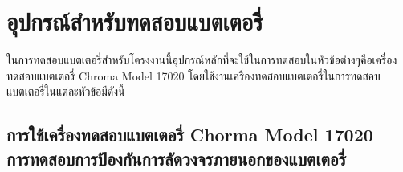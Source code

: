 \section{อุปกรณ์สำหรับทดสอบแบตเตอรี่}
ในการทดสอบแบตเตอรี่สำหรับโครงงานนี้อุปกรณ์หลักที่จะใช้ในการทดสอบในหัวข้อต่างๆคือเครื่องทดสอบแบตเตอรี่ Chroma Model 17020 โดยใช้งานเครื่องทดสอบแบตเตอรี่ในการทดสอบแบตเตอรี่ในแต่ละหัวข้อมีดังนี้
\subsection{การใช้เครื่องทดสอบแบตเตอรี่ Chorma Model 17020 \\ การทดสอบการป้องกันการลัดวงจรภายนอกของแบตเตอรี่}
















